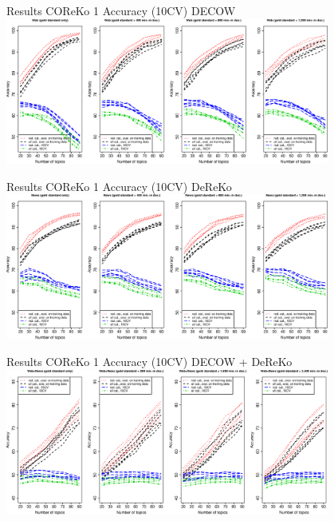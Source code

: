 \begin{frame}
  {Results COReKo 1}
  Accuracy (10CV) DECOW\\
  \centering
  \vspace{0.5cm}
  \includegraphics[width=0.8\textwidth]{graphics/cow}
\end{frame}

\begin{frame}
  {Results COReKo 1}
  Accuracy (10CV) DeReKo\\
  \centering
  \vspace{0.5cm}
  \includegraphics[width=0.8\textwidth]{graphics/dereko}
\end{frame}

\begin{frame}
  {Results COReKo 1}
  Accuracy (10CV) \alert{DECOW + DeReKo}\\
  \centering
  \vspace{0.5cm}
  \includegraphics[width=0.8\textwidth]{graphics/coreko}
\end{frame}

